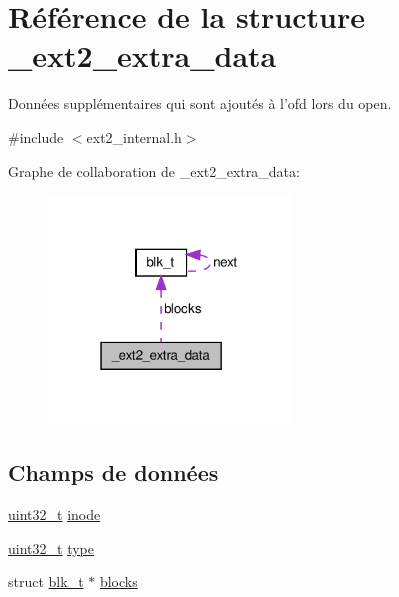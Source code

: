 \hypertarget{struct__ext2__extra__data}{\section{\-Référence de la structure \-\_\-ext2\-\_\-extra\-\_\-data}
\label{struct__ext2__extra__data}
}


\-Données supplémentaires qui sont ajoutés à l'ofd lors du open.  




{\ttfamily \#include $<$ext2\-\_\-internal.\-h$>$}



\-Graphe de collaboration de \-\_\-ext2\-\_\-extra\-\_\-data\-:\nopagebreak
\begin{figure}[H]
\begin{center}
\leavevmode
\includegraphics[width=183pt]{struct__ext2__extra__data__coll__graph}
\end{center}
\end{figure}
\subsection*{\-Champs de données}
\begin{DoxyCompactItemize}
\item 
\hyperlink{types_8h_a33594304e786b158f3fb30289278f5af}{uint32\-\_\-t} \hyperlink{struct__ext2__extra__data_a67635cdfceeb4475b1410ec3bc8ae552}{inode}
\item 
\hyperlink{types_8h_a33594304e786b158f3fb30289278f5af}{uint32\-\_\-t} \hyperlink{struct__ext2__extra__data_a607854c0e8d75ee5be59b7e67eb2a00c}{type}
\item 
struct \hyperlink{structblk__t}{blk\-\_\-t} $\ast$ \hyperlink{struct__ext2__extra__data_ab7503f7c0104cc8e081af354595fb1a0}{blocks}
\end{DoxyCompactItemize}


